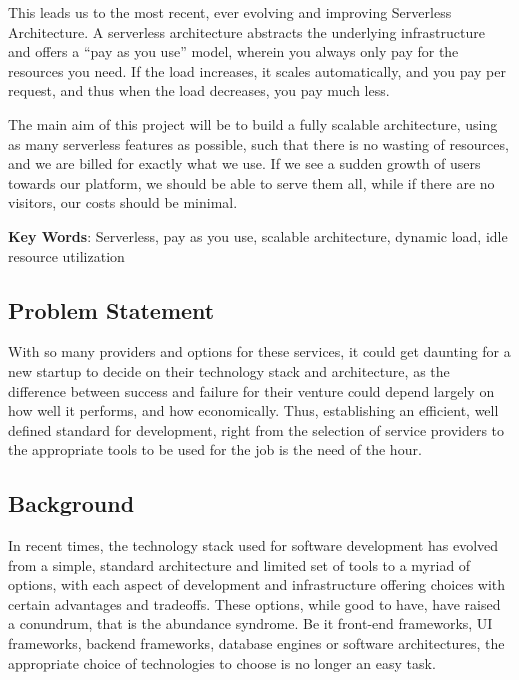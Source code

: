 \smallskip

This leads us to the most recent, ever evolving and improving Serverless Architecture. A serverless architecture abstracts 
the underlying infrastructure and offers a “pay as you use” model, wherein you always only pay for the resources you need. 
If the load increases, it scales automatically, and you pay per request, and thus when the load decreases, you pay much less.

\smallskip

The main aim of this project will be to build a fully scalable architecture, using as many serverless features as possible, 
such that there is no wasting of resources, and we are billed for exactly what we use. If we see a sudden growth of users 
towards our platform, we should be able to serve them all, while if there are no visitors, our costs should be minimal. 

\textbf{Key Words}: Serverless, pay as you use, scalable architecture, dynamic load, idle resource utilization 

\subsection{Problem Statement} 

With so many providers and options for these services, it could get daunting for a new startup to decide on their technology stack and architecture, as the difference between success and failure for their venture could depend largely on how well it performs, and how economically. Thus, establishing an efficient, well defined standard for development, right from the selection of service providers to the appropriate tools to be used for the job is the need of the hour. 

\subsection{Background} 

In recent times, the technology stack used for software development has evolved from a simple, standard architecture and limited set of tools to a myriad of options, with each aspect of development and infrastructure offering choices with certain advantages and tradeoffs. These options, while good to have, have raised a conundrum, that is the abundance syndrome. Be it front-end frameworks, UI frameworks, backend frameworks, database engines or software architectures, the appropriate choice of technologies to choose is no longer an easy task.

